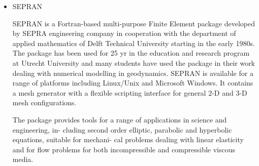 \begin{itemize}
{\small
\noindent
\cite{egat10}
}

\item {\codefont SEPRAN} 

SEPRAN \cite{sepr05} is a Fortran-based
multi-purpose Finite Element package developed by SEPRA engineering company in
cooperation with the department of applied mathematics of Delft Technical University
starting in the early 1980s. The package has been used for 25 yr in the education and
research program at Utrecht University and many students have used the package in
their work dealing with numerical modelling in geodynamics. SEPRAN is available for
a range of platforms including Linux/Unix and Microsoft Windows. It contains a mesh
generator with a flexible scripting interface for general 2-D and 3-D mesh configurations.

The package provides tools for a range of applications in science and engineering, in-
cluding second order elliptic, parabolic and hyperbolic equations, suitable for mechani-
cal problems dealing with linear elasticity and for flow problems for both incompressible
and compressible viscous media.


\end{itemize}
